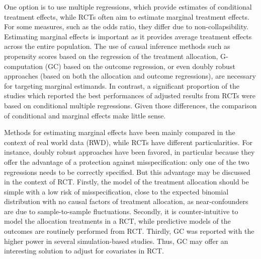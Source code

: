 \documentclass{article}
\begin{document}
One option is to use multiple regressions, which provide estimates of  conditional  treatment effects,  while RCTs often aim to  estimate marginal treatment effects. \cite{center_for_drug_evaluation_and_research_fda_adjusting_2023} For some measures, such as the odds ratio, they differ due to non-collapsibility.\cite{greenland_interpretation_1987} Estimating marginal effects is important as it provides average treatment effects across the entire population. The use of causal inference methods such as propensity scores based on the regression of the treatment allocation, \cite{williamson_variance_2014, zeng_propensity_2021}  G-computation (GC) based on the outcome regression, \cite{snowden_implementation_2011} or even doubly robust approaches (based on both the allocation and outcome regressions), \cite{lendle_targeted_2013} are necessary for targeting marginal estimands. In contrast, a significant proportion of the studies which reported the best performances of adjusted results from RCTs were based on conditional multiple regressions. Given those differences, the comparison of conditional and marginal effects make little sense. \cite{daniel_making_2021}


Methods for estimating marginal effects have been mainly compared in the context of real world data (RWD), while RCTs have different particularities. For instance, doubly robust approaches have been favored, in particular because they offer the advantage of a protection against misspecification: only one of the two regressions needs to be correctly specified. \cite{funk_doubly_2011} But this advantage may be discussed in the context of RCT. Firstly,  the model of the treatment allocation should be simple with a low risk of misspecification, close to the expected binomial distribution with no causal factors of treatment allocation, as near-confounders are due to sample-to-sample fluctuations. Secondly, it is counter-intuitive to model the allocation treatments in a RCT, while predictive models of the outcomes are routinely performed from RCT.  Thirdly, GC was reported with the higher power in several simulation-based studies. \cite{colson_optimizing_2016, chatton_g-computation_2020} Thus, GC may offer an interesting solution to adjust for covariates in RCT.
\end{document}
